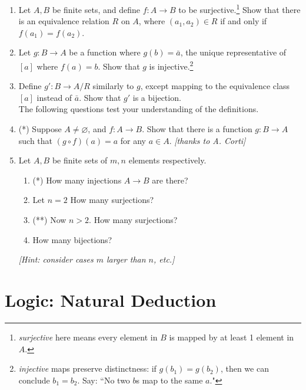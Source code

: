 \documentclass[10pt,a4paper]{article}
\begin{document}
\begin{enumerate}
    \item Let \(A, B\) be finite sets, and define 
    \(f : A \rightarrow B \) to be 
    surjective.\footnote{\emph{surjective} here means every element in 
    \(B\) is mapped by at least 1 element in \(A\).}
    Show that there is an equivalence relation \(R\) on \(A\), 
    where \( (a_1, a_2) \in R \) if and only if \( f(a_1) = f(a_2) \).

    \item Let \( g : B \rightarrow A \) be a function where 
    \( g(b) = \bar a \), the unique representative of \([a]\) 
    where \(f(a) = b\). Show that \(g\) is 
    injective.\footnote{\emph{injective} maps preserve distinctness: 
    if \( g(b_1) = g(b_2) \), then we can conclude \( b_1 = b_2 \). 
    Say: ``No two \(b\)s map to the same \(a\)."}

    \item Define \( g' : B \rightarrow A/R \) similarly to \(g\), 
    except mapping to the equivalence class \([a]\) instead of \( \bar a \). 
    Show that \(g'\) is a bijection. \\

    The following questions test your understanding of the definitions.
    \item (*) Suppose \( A \ne \varnothing \), and \( f : A \rightarrow B \). 
    Show that there is a function \( g : B \rightarrow A \) such that 
    \( (g \circ f) (a) = a \) for any \(a \in A\).
    \emph{[thanks to A. Corti]}

    \item Let \(A, B\) be finite sets of \(m, n\) elements respectively.
    \begin{enumerate}
        \item (*) How many injections \( A \rightarrow B\) are there?
        \item Let \( n = 2 \) How many surjections?
        \item (**) Now \( n > 2 \). How many surjections?
        \item How many bijections?
    \end{enumerate}
    \emph{[Hint: consider cases \(m\) larger than \(n\), etc.]}
\end{enumerate}


\section{Logic: Natural Deduction}
\end{document}
